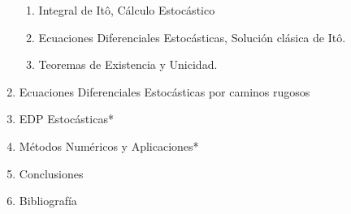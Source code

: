 \documentclass[12pt, twocolumns]{book}
\begin{document}
\begin{enumerate}
\begin{enumerate}
	\item Integral de Itô, Cálculo Estocástico
	\item Ecuaciones Diferenciales Estocásticas, Solución clásica de Itô.
	\item Teoremas de Existencia y Unicidad.

\end{enumerate}



\item Ecuaciones Diferenciales Estocásticas por caminos rugosos



\item EDP Estocásticas*
\item Métodos Numéricos y Aplicaciones*
\item Conclusiones
\item Bibliografía

\end{enumerate}

\newpage





\tableofcontents















\end{document}
